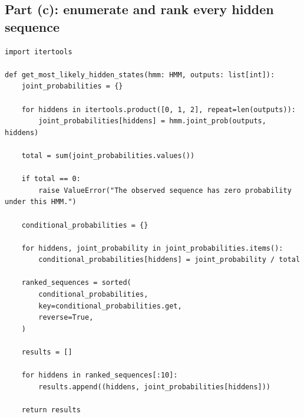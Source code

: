 \documentclass[11pt,a4paper]{article}
\begin{document}
\subsection{Part (c): enumerate and rank every hidden sequence}
\begin{lstlisting}
import itertools

def get_most_likely_hidden_states(hmm: HMM, outputs: list[int]):
    joint_probabilities = {}

    for hiddens in itertools.product([0, 1, 2], repeat=len(outputs)):
        joint_probabilities[hiddens] = hmm.joint_prob(outputs, hiddens)

    total = sum(joint_probabilities.values())

    if total == 0:
        raise ValueError("The observed sequence has zero probability under this HMM.")

    conditional_probabilities = {}

    for hiddens, joint_probability in joint_probabilities.items():
        conditional_probabilities[hiddens] = joint_probability / total

    ranked_sequences = sorted(
        conditional_probabilities,
        key=conditional_probabilities.get,
        reverse=True,
    )

    results = []

    for hiddens in ranked_sequences[:10]:
        results.append((hiddens, joint_probabilities[hiddens]))

    return results
\end{lstlisting}
\end{document}
